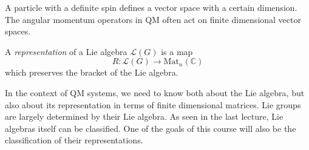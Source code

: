 
A particle with a definite spin defines a vector space with a certain dimension.
The angular momentum operators in QM often act on finite dimensional vector spaces.

\begin{definition}[Representation]
  A \emph{representation} of a Lie algebra $\mathscr{L}(G)$ is a map
  \begin{equation}
    R \colon \mathscr{L}(G) \to \text{Mat}_n (\mathbb{C})
  \end{equation}
  which preserves the bracket of the Lie algebra.
\end{definition}

\begin{leftbar}
  \begin{remark}
    In the context of QM systems, we need to know both about the Lie algebra, but also about its representation in terms of finite dimensional matrices.
    Lie groups are largely determined by their Lie algebra. As seen in the last lecture, Lie algebras itself can be classified. One of the goals of this course will also be the classification of their representations.
  \end{remark}
\end{leftbar}

